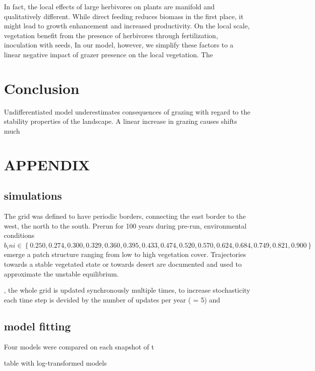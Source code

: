 In fact, the local effects of large herbivores on plants are manifold and qualitatively different. While direct feeding reduces biomass in the first place, it might lead to growth enhancement and increased productivity. On the local scale, vegetation benefit from the presence of herbivores through fertilization, inoculation with seeds, 
In our model, however, we simplify these factors to a linear negative impact of grazer presence on the local vegetation. The  

\section{Conclusion}
Undifferentiated model underestimates consequences of grazing with regard to the stability properties of the landscape. 
A linear increase in grazing causes shifts much  




\newpage

\section{APPENDIX}

\subsection{simulations}

The grid was defined to have periodic borders, connecting the east border to the west, the north to the south.
Prerun for 100 years
during pre-run, environmental conditions $b_ini \in \left\{ 0.250, 0.274, 0.300, 0.329, 0.360, 0.395, 0.433, 0.474, 0.520, 0.570, 0.624, 0.684, 0.749, 0.821, 0.900 \right\} $ emerge a patch structure ranging from low to high vegetation cover. Trajectories towards a stable vegetated state or towards desert are documented and used to approximate the unstable equilibrium.

, the whole grid is updated synchronously multiple times, to increase stochasticity
each time step is devided by the number of updates per year ( = 5) and

\subsection{model fitting}
 Four models were compared on each snapshot of t


table with log-transformed models



